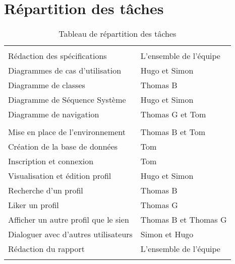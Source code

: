 \chapter{Répartition des tâches}
\small
\begin{longtable}{|p{8cm}p{8cm}|}
\hline
\cellcolor{blue!25}{\textbf{Tâche}} & \cellcolor{blue!25}{\textbf{Responsable}} \\\hline
\cellcolor{gray}{\textbf{Conception}} & \cellcolor{gray} \\\hline
Rédaction des spécifications & L'ensemble de l'équipe \\\hline
Diagrammes de cas d'utilisation & Hugo et Simon \\\hline
Diagramme de classes & Thomas B \\\hline
Diagramme de Séquence Système & Hugo et Simon \\\hline
Diagramme de navigation & Thomas G et Tom \\\hline
\cellcolor{gray}{\textbf{Développement}} & \cellcolor{gray} \\\hline
Mise en place de l'environnement & Thomas B et Tom \\\hline
Création de la base de données & Tom \\\hline
Inscription et connexion & Tom \\\hline
Visualisation et édition profil & Hugo et Simon \\\hline
Recherche d'un profil & Thomas B \\\hline
Liker un profil & Thomas G \\\hline
Afficher un autre profil que le sien & Thomas B et Thomas G \\\hline
Dialoguer avec d'autres utilisateurs & Simon et Hugo \\\hline
Rédaction du rapport & L'ensemble de l'équipe \\\hline


\endfoot
\caption{Tableau de répartition des tâches}

\end{longtable}
